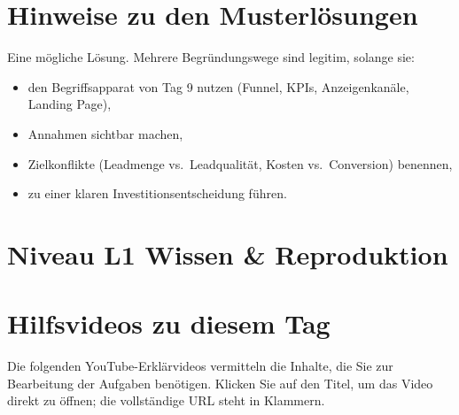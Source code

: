 \documentclass[11pt,a4paper,oneside]{article}
\begin{document}
\section*{Hinweise zu den Musterlösungen}
\thispagestyle{plain}

\noindent Eine mögliche Lösung. Mehrere Begründungswege sind legitim, solange sie:

\begin{itemize}
  \item den Begriffsapparat von Tag 9 nutzen (Funnel, KPIs, Anzeigenkanäle, Landing Page),
  \item Annahmen sichtbar machen,
  \item Zielkonflikte (Leadmenge vs.\ Leadqualität, Kosten vs.\ Conversion) benennen,
  \item zu einer klaren Investitionsentscheidung führen.
\end{itemize}

\clearpage

\section*{Niveau L1 \textendash{} Wissen \& Reproduktion}

\section*{Hilfsvideos zu diesem Tag}
\thispagestyle{plain}

\noindent Die folgenden YouTube-Erkl\"arvideos vermitteln die Inhalte, die Sie zur Bearbeitung der Aufgaben ben\"otigen. Klicken Sie auf den Titel, um das Video direkt zu \"offnen; die vollst\"andige URL steht in Klammern.
\end{document}

